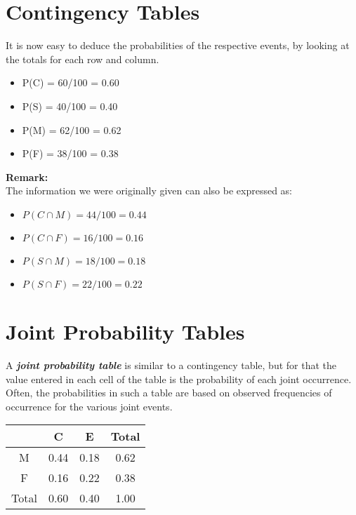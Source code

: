 	
	
	\section{Contingency Tables}
	It is now easy to deduce the probabilities of the respective events, by looking at the totals for each row and column.
	\begin{itemize}
		\item P(C) = 60/100 = 0.60
		\item P(S) = 40/100 = 0.40
		\item P(M) = 62/100 = 0.62
		\item P(F) = 38/100 = 0.38
	\end{itemize}
	\textbf{Remark:}\\
	The information we were originally given can also be expressed as:
	\begin{itemize}
		\item $P(C \cap M) = 44/100 = 0.44$
		\item $P(C \cap F) = 16/100 = 0.16$
		\item $P(S \cap M) = 18/100 = 0.18$
		\item $P(S \cap F) = 22/100 = 0.22$
	\end{itemize}




\section{Joint Probability Tables}

A \textbf{\emph{joint probability table}} is similar to a contingency table, but for that the value entered in
each cell of the table is the probability of each joint occurrence. Often, the probabilities in such a table are based
on observed frequencies of occurrence for the various joint events.
\begin{center}
\begin{tabular}{|c||c|c||c|}
\hline
& C & E & Total \\ \hline \hline
M & 0.44 & 0.18 & 0.62 \\ \hline
F & 0.16 & 0.22 & 0.38 \\ \hline \hline
Total & 0.60 & 0.40 & 1.00 \\ \hline
\end{tabular}
\end{center}

